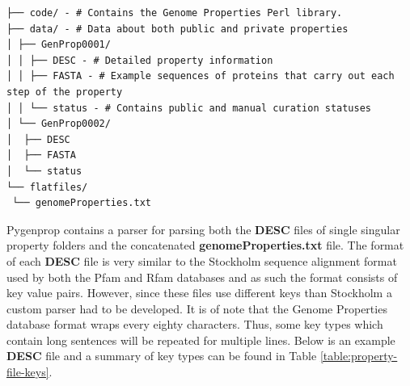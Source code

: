 \begin{verbatim}
├── code/ - # Contains the Genome Properties Perl library.
├── data/ - # Data about both public and private properties
│ ├── GenProp0001/
│ │ ├── DESC - # Detailed property information
│ │ ├── FASTA - # Example sequences of proteins that carry out each step of the property
│ │ └── status - # Contains public and manual curation statuses
│ └── GenProp0002/
│  ├── DESC
│  ├── FASTA
│  └── status
└── flatfiles/
 └── genomeProperties.txt
\end{verbatim}

Pygenprop contains a parser for parsing both the \textbf{DESC} files of single singular property folders and the concatenated \textbf{genomeProperties.txt} file. The format of each \textbf{DESC} file is very similar to the Stockholm sequence alignment format used by both the Pfam and Rfam databases \cite{bateman2004pfam, griffiths2003rfam} and as such the format consists of key value pairs. However, since these files use different keys than Stockholm a custom parser had to be developed. It is of note that the Genome Properties database format wraps every eighty characters. Thus, some key types which contain long sentences will be repeated for multiple lines. Below is an example \textbf{DESC} file and a summary of key types can be found in Table \ref{table:property-file-keys}.

